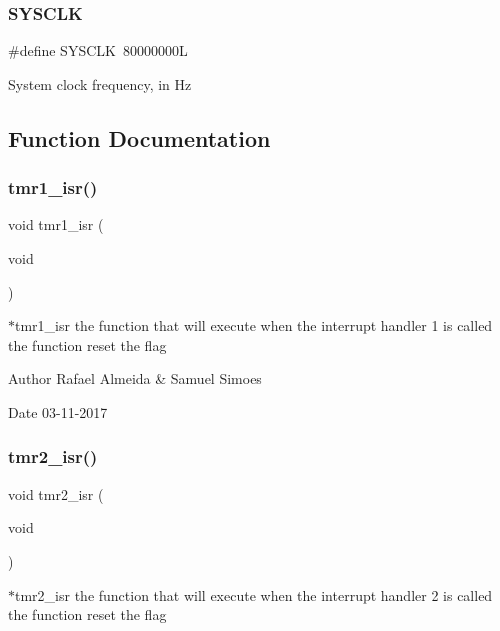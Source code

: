 \subsubsection{S\+Y\+S\+C\+LK}
{\footnotesize\ttfamily \#define S\+Y\+S\+C\+LK~80000000L}

System clock frequency, in Hz 

\subsection{Function Documentation}
\mbox{\label{_timer__libs_8c_af03ffc6eb9d4dfc742513301eb656ba5}} 
\subsubsection{tmr1\+\_\+isr()}
{\footnotesize\ttfamily void tmr1\+\_\+isr (\begin{DoxyParamCaption}\item[{void}]{ }\end{DoxyParamCaption})}



$\ast$tmr1\+\_\+isr the function that will execute when the interrupt handler 1 is called the function reset the flag 

\begin{DoxyAuthor}{Author}
Rafael Almeida \& Samuel Simoes 
\end{DoxyAuthor}
\begin{DoxyDate}{Date}
03-\/11-\/2017 
\end{DoxyDate}
\mbox{\label{_timer__libs_8c_a8de6a5e8a74fe35d5e749ef46af8e7ea}} 
\subsubsection{tmr2\+\_\+isr()}
{\footnotesize\ttfamily void tmr2\+\_\+isr (\begin{DoxyParamCaption}\item[{void}]{ }\end{DoxyParamCaption})}



$\ast$tmr2\+\_\+isr the function that will execute when the interrupt handler 2 is called the function reset the flag 

